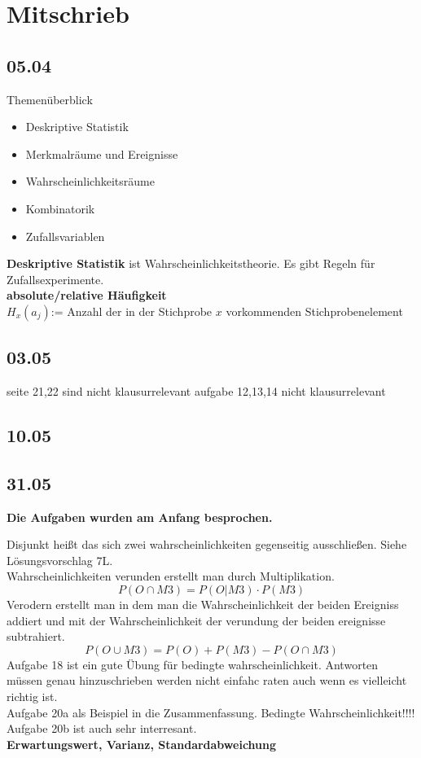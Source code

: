 \section{Mitschrieb}


\subsection{05.04}

Themenüberblick
\begin{itemize}
    \item Deskriptive Statistik
    \item Merkmalräume und Ereignisse
    \item Wahrscheinlichkeitsräume 
    \item Kombinatorik 
    \item Zufallsvariablen
\end{itemize}

\textbf{Deskriptive Statistik} ist Wahrscheinlichkeitstheorie. 
Es gibt Regeln für Zufallsexperimente. \\

\textbf{absolute/relative Häufigkeit}\\
$H_x(a_j)$:= Anzahl der in der Stichprobe $x$ vorkommenden Stichprobenelement

\subsection{03.05}
seite 21,22 sind nicht klausurrelevant
aufgabe 12,13,14 nicht klausurrelevant 

\subsection{10.05}


\subsection{31.05}

\textbf{Die Aufgaben wurden am Anfang besprochen.}

Disjunkt heißt das sich zwei wahrscheinlichkeiten gegenseitig ausschließen. Siehe Lösungsvorschlag 7L.\\
Wahrscheinlichkeiten verunden erstellt man durch Multiplikation.
\[P(O\cap M3)=P(O|M3)\cdot P(M3)\]
Verodern erstellt man in dem man die Wahrscheinlichkeit der beiden Ereigniss addiert und mit der Wahrscheinlichkeit der verundung der beiden ereignisse subtrahiert.
\[P(O\cup M3)=P(O)+P(M3)-P(O\cap M3)\]
Aufgabe 18 ist ein gute Übung für bedingte wahrscheinlichkeit.
Antworten müssen genau hinzuschrieben werden nicht einfahc raten auch wenn es vielleicht richtig ist.\\
Aufgabe 20a als Beispiel in die Zusammenfassung. Bedingte Wahrscheinlichkeit!!!!\\
Aufgabe 20b ist auch sehr interresant.\\
\textbf{Erwartungswert, Varianz, Standardabweichung}\\

